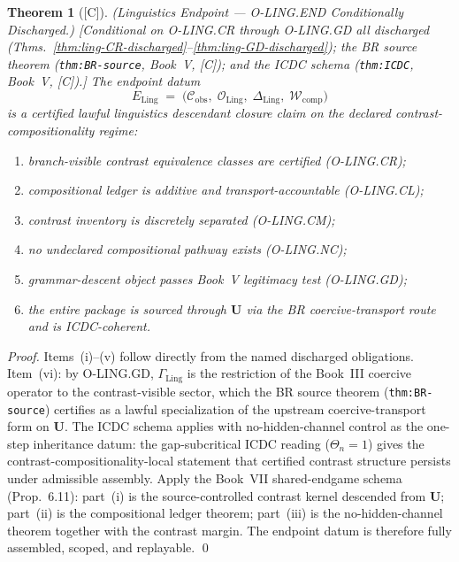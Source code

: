 \documentclass[12pt,oneside]{amsbook}
\theoremstyle{plain}
\newtheorem{theorem}{Theorem}[section]
\theoremstyle{definition}
\theoremstyle{remark}
\newcommand{\status}[1]{\textup{[#1]}}
\begin{document}
\begin{theorem}[\status{C}]\label{thm:ling-END-discharged}
\textup{(Linguistics Endpoint --- O-LING.END Conditionally Discharged.)}
\textup{[Conditional on O-LING.CR through O-LING.GD all discharged
(Thms.~\ref{thm:ling-CR-discharged}--\ref{thm:ling-GD-discharged}); the
BR source theorem (\texttt{thm:BR-source}, Book~V, [C]); and the ICDC
schema (\texttt{thm:ICDC}, Book~V, [C]).]}
The endpoint datum
\[
 E_{\mathrm{Ling}} \;=\;
 \bigl(\mathcal{C}_{\mathrm{obs}},\;
 \mathcal{O}_{\mathrm{Ling}},\;
 \Delta_{\mathrm{Ling}},\;
 \mathcal{W}_{\mathrm{comp}}\bigr)
\]
is a certified lawful linguistics descendant closure claim on the declared
contrast-compositionality regime:
\begin{enumerate}[label=\textup{(\roman*)}]
 \item branch-visible contrast equivalence classes are certified
 (O-LING.CR);
 \item compositional ledger is additive and transport-accountable
 (O-LING.CL);
 \item contrast inventory is discretely separated (O-LING.CM);
 \item no undeclared compositional pathway exists (O-LING.NC);
 \item grammar-descent object passes Book~V legitimacy test
 (O-LING.GD);
 \item the entire package is sourced through $\mathbf{U}$ via the BR
 coercive-transport route and is ICDC-coherent.
\end{enumerate}
\end{theorem}

\begin{proof}
Items~(i)--(v) follow directly from the named discharged obligations.
Item~(vi): by O-LING.GD, $\Gamma_{\mathrm{Ling}}$ is the restriction
of the Book~III coercive operator to the contrast-visible sector, which
the BR source theorem (\texttt{thm:BR-source}) certifies as a lawful
specialization of the upstream coercive-transport form on $\mathbf{U}$.
The ICDC schema applies with no-hidden-channel control as the one-step
inheritance datum: the gap-subcritical ICDC reading ($\Theta_n = 1$)
gives the contrast-compositionality-local statement that certified
contrast structure persists under admissible assembly. Apply the
Book~VII shared-endgame schema (Prop.~6.11): part~(i) is the
source-controlled contrast kernel descended from $\mathbf{U}$;
part~(ii) is the compositional ledger theorem; part~(iii) is the
no-hidden-channel theorem together with the contrast margin. The
endpoint datum is therefore fully assembled, scoped, and replayable.
\qed
\end{proof}
\end{document}
